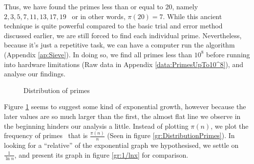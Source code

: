 Thus, we have found the primes less than or equal to 20, namely $2, 3, 5, 7, 11, 13, 17, 19$ \textendash\ or in other words, $\pi(20) = 7$. While this ancient technique is quite powerful compared to the basic trial and error method discussed earlier, we are still forced to find each individual prime. Nevertheless, because it's just a repetitive task, we can have a computer run the algorithm (Appendix \ref{ap:Sieve}). In doing so, we find all primes less than $10^8$ before running into hardware limitations (Raw data in Appendix \ref{data:PrimesUpTo10^8}), and analyse our findings.
\begin{figure}[h]
\caption{Distribution of primes}
\label{gr:ExpDistribution}
\end{figure}

Figure \ref{gr:ExpDistribution} seems to suggest some kind of exponential growth, however because the later values are so much larger than the first, the almost flat line we observe in the beginning hinders our analysis a little. Instead of plotting $\pi(n)$, we plot the frequency of primes \textendash\ that is $\frac{\pi(n)}{n}$ (Seen in figure \ref{gr:DistributionPrimes}). In looking for a ``relative'' of the exponential graph we hypothesised, we settle on $\frac{1}{\ln n}$, and present its graph in figure \ref{gr:1/lnx} for comparison.
	
